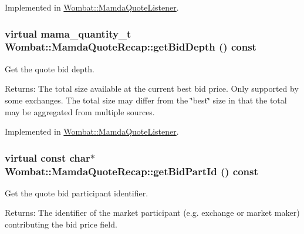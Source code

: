 Implemented in \hyperlink{classWombat_1_1MamdaQuoteListener_578f45a1ddaa18b8447cda08b943153e}{Wombat::Mamda\-Quote\-Listener}.\hypertarget{classWombat_1_1MamdaQuoteRecap_3e79b78c772dbba38ee9855e15557f9b}{
\subsubsection[getBidDepth]{\setlength{\rightskip}{0pt plus 5cm}virtual mama\_\-quantity\_\-t Wombat::Mamda\-Quote\-Recap::get\-Bid\-Depth () const}}
\label{classWombat_1_1MamdaQuoteRecap_3e79b78c772dbba38ee9855e15557f9b}


Get the quote bid depth. 

\begin{Desc}
\item[Returns:]The total size available at the current best bid price. Only supported by some exchanges. The total size may differ from the \char`\"{}best\char`\"{} size in that the total may be aggregated from multiple sources. \end{Desc}


Implemented in \hyperlink{classWombat_1_1MamdaQuoteListener_3f4909f6e25bef5324df4c4fa89bda74}{Wombat::Mamda\-Quote\-Listener}.\hypertarget{classWombat_1_1MamdaQuoteRecap_0331215585ede823c609f4ddd164a902}{
\subsubsection[getBidPartId]{\setlength{\rightskip}{0pt plus 5cm}virtual const char$\ast$ Wombat::Mamda\-Quote\-Recap::get\-Bid\-Part\-Id () const}}
\label{classWombat_1_1MamdaQuoteRecap_0331215585ede823c609f4ddd164a902}


Get the quote bid participant identifier. 

\begin{Desc}
\item[Returns:]The identifier of the market participant (e.g. exchange or market maker) contributing the bid price field. \end{Desc}


